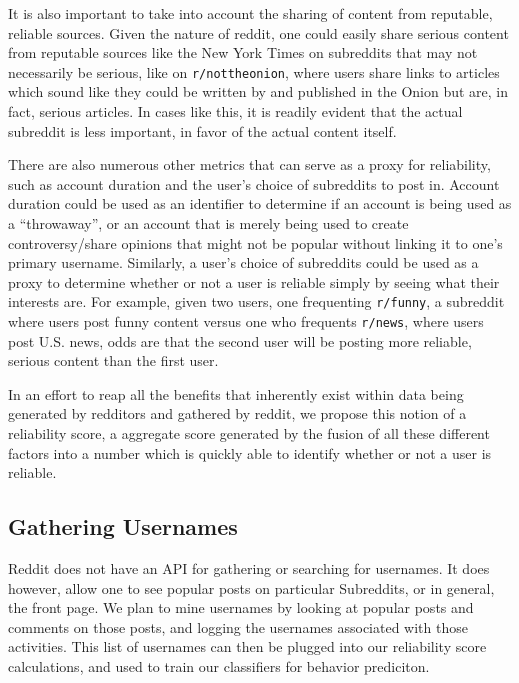 It is also important to take into account the sharing of content from reputable,
reliable sources. Given the nature of reddit, one could easily share serious
content from reputable sources like the New York Times on subreddits that may
not necessarily be serious, like on \texttt{r/nottheonion}, where users share
links to articles which sound like they could be written by and published in the
Onion but are, in fact, serious articles. In cases like this, it is readily
evident that the actual subreddit is less important, in favor of the actual
content itself.

There are also numerous other metrics that can serve as a proxy for reliability,
such as account duration and the user's choice of subreddits to post in. Account
duration could be used as an identifier to determine if an account is being used
as a ``throwaway'', or an account that is merely being used to create
controversy/share opinions that might not be popular without linking it to one's
primary username. Similarly, a user's choice of subreddits could be used as a
proxy to determine whether or not a user is reliable simply by seeing what their
interests are. For example, given two users, one frequenting \texttt{r/funny}, a
subreddit where users post funny content versus one who frequents
\texttt{r/news}, where users post U.S. news, odds are that the second user will
be posting more reliable, serious content than the first user.

In an effort to reap all the benefits that inherently exist within data being
generated by redditors and gathered by reddit, we propose this notion of a
reliability score, a aggregate score generated by the fusion of all these
different factors into a number which is quickly able to identify whether or not
a user is reliable.


\subsection{Gathering Usernames}
\label{sub:gathering_usernames}

Reddit does not have an API for gathering or searching for usernames. It does
however, allow one to see popular posts on particular Subreddits, or in general,
the front page. We plan to mine usernames by looking at popular posts and
comments on those posts, and logging the usernames associated with those
activities. This list of usernames can then be plugged into our reliability
score calculations, and used to train our classifiers for behavior prediciton.

